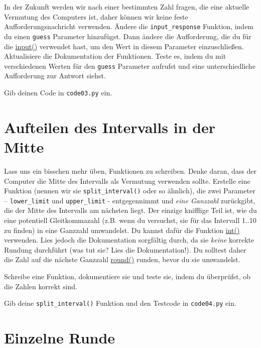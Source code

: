 \documentclass[
]{book}
\begin{document}
In der Zukunft werden wir nach einer bestimmten Zahl fragen, die eine aktuelle Vermutung des Computers ist, daher können wir keine feste Aufforderungsnachricht verwenden. Ändere die \texttt{input\_response} Funktion, indem du einen \texttt{guess} Parameter hinzufügst. Dann ändere die Aufforderung, die du für die \href{https://docs.python.org/3/library/functions.html\#input}{input()} verwendet hast, um den Wert in diesem Parameter einzuschließen. Aktualisiere die Dokumentation der Funktionen. Teste es, indem du mit verschiedenen Werten für den \texttt{guess} Parameter aufrufst und eine unterschiedliche Aufforderung zur Antwort siehst.

Gib deinen Code in \texttt{code03.py} ein.

\hypertarget{aufteilen-des-intervalls-in-der-mitte}{%
\section{Aufteilen des Intervalls in der Mitte}\label{aufteilen-des-intervalls-in-der-mitte}}

Lass uns ein bisschen mehr üben, Funktionen zu schreiben. Denke daran, dass der Computer die Mitte des Intervalls als Vermutung verwenden sollte. Erstelle eine Funktion (nennen wir sie \texttt{split\_interval()} oder so ähnlich), die zwei Parameter -- \texttt{lower\_limit} und \texttt{upper\_limit} - entgegennimmt und \emph{eine Ganzzahl} zurückgibt, die der Mitte des Intervalls am nächsten liegt. Der einzige knifflige Teil ist, wie du eine potentiell Gleitkommazahl (z.B. wenn du versuchst, sie für das Intervall 1..10 zu finden) in eine Ganzzahl umwandelst. Du kannst dafür die Funktion \href{https://docs.python.org/3/library/functions.html\#int}{int()} verwenden. Lies jedoch die Dokumentation sorgfältig durch, da sie \emph{keine} korrekte Rundung durchführt (was tut sie? Lies die Dokumentation!). Du solltest daher die Zahl auf die nächste Ganzzahl \href{https://docs.python.org/3/library/functions.html\#round}{round()} runden, bevor du sie umwandelst.

Schreibe eine Funktion, dokumentiere sie und teste sie, indem du überprüfst, ob die Zahlen korrekt sind.

Gib deine \texttt{split\_interval()} Funktion und den Testcode in \texttt{code04.py} ein.

\hypertarget{einzelne-runde}{%
\section{Einzelne Runde}\label{einzelne-runde}}
\end{document}
